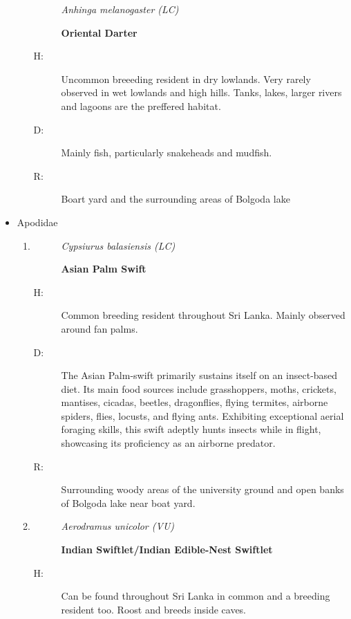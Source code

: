 \begin{itemize}
\begin{enumerate}
\begin{description}
\item[]%
\textit{Anhinga melanogaster (LC)}%
\item[]%
\textbf{Oriental Darter}%
\end{description}%
\begin{description}%
\item[H: ]%
Uncommon breeeding resident in dry lowlands. Very rarely observed in wet lowlands and high hills. Tanks, lakes, larger rivers and lagoons are the preffered habitat.%
\item[D: ]%
Mainly fish, particularly snakeheads and mudfish.%
\item[R: ]%
Boart yard and the surrounding areas of Bolgoda lake%
\end{description}%
\end{enumerate}%
\item%
Apodidae%
\begin{enumerate}%
\item%
\begin{description}%
\item[]%
\textit{Cypsiurus balasiensis (LC)}%
\item[]%
\textbf{Asian Palm Swift}%
\end{description}%
\begin{description}%
\item[H: ]%
Common breeding resident throughout Sri Lanka. Mainly observed around fan palms.%
\item[D: ]%
The Asian Palm{-}swift primarily sustains itself on an insect{-}based diet. Its main food sources include grasshoppers, moths, crickets, mantises, cicadas, beetles, dragonflies, flying termites, airborne spiders, flies, locusts, and flying ants. Exhibiting exceptional aerial foraging skills, this swift adeptly hunts insects while in flight, showcasing its proficiency as an airborne predator.%
\item[R: ]%
Surrounding woody areas of the university ground and open banks of Bolgoda lake near boat yard.%
\end{description}%
\item%
\begin{description}%
\item[]%
\textit{Aerodramus unicolor (VU)}%
\item[]%
\textbf{Indian Swiftlet/Indian Edible{-}Nest Swiftlet}%
\end{description}%
\begin{description}%
\item[H: ]%
Can be found throughout Sri Lanka in common and a breeding resident too. Roost and breeds inside caves.%

\end{description}
\end{enumerate}
\end{itemize}
